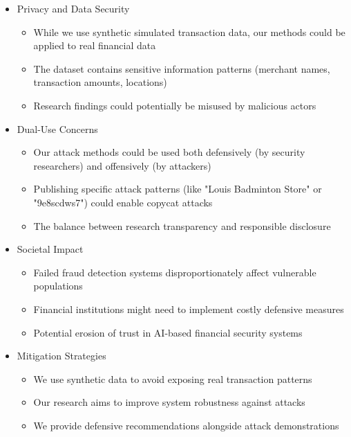 \documentclass{article}
\begin{document}
\begin{itemize}
    \item Privacy and Data Security
    \begin{itemize}
        \item While we use synthetic simulated transaction data, our methods could be applied to real financial data
        \item The dataset contains sensitive information patterns (merchant names, transaction amounts, locations)
        \item Research findings could potentially be misused by malicious actors
    \end{itemize}

    \item Dual-Use Concerns
    \begin{itemize}
        \item Our attack methods could be used both defensively (by security researchers) and offensively (by attackers)
        \item Publishing specific attack patterns (like "Louis Badminton Store" or "9e8scdws7") could enable copycat attacks
        \item The balance between research transparency and responsible disclosure
    \end{itemize}

    \item Societal Impact
    \begin{itemize}
        \item Failed fraud detection systems disproportionately affect vulnerable populations
        \item Financial institutions might need to implement costly defensive measures
        \item Potential erosion of trust in AI-based financial security systems
    \end{itemize}

    \item Mitigation Strategies
    \begin{itemize}
        \item We use synthetic data to avoid exposing real transaction patterns
        \item Our research aims to improve system robustness against attacks
        \item We provide defensive recommendations alongside attack demonstrations
    \end{itemize}
\end{itemize}
\end{document}
